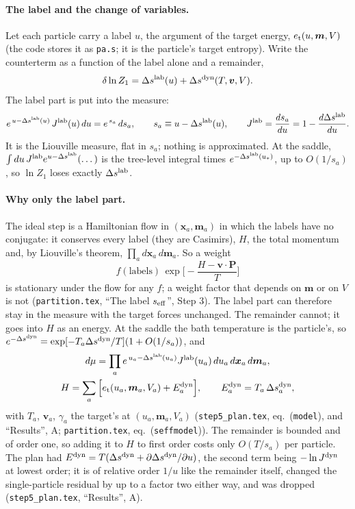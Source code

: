 \documentclass[11pt,aps,preprint,nofootinbib,superscriptaddress,tightenlines]{revtex4-2}
\def\st{\begin{equation}}
\def\stp{\end{equation}}
\let\oldparagraph\paragraph
\renewcommand{\paragraph}{\par\bigskip\oldparagraph}
\begin{document}
\paragraph{The label and the change of variables.}  Let each particle carry a label $u$, the argument of the target energy, $e_{\rm t}(u,\bm m,V)$ (the
code stores it as \texttt{pa.s}; it is the particle's target entropy).  Write the counterterm as a function of the label alone and a remainder,
\st
\delta\ln Z_1=\Delta s^{\rm lab}(u)+\Delta s^{\rm dyn}(T,\bm v,V) .
\label{eq:splitdef}
\stp
The label part is put into the measure:
\st
e^{\,u-\Delta s^{\rm lab}(u)}\,J^{\rm lab}(u)\,du=e^{\,s_a}\,ds_a,\qquad s_a\equiv u-\Delta s^{\rm lab}(u),\qquad J^{\rm lab}=\frac{ds_a}{du}=1-\frac{d\Delta s^{\rm lab}}{du} .
\label{eq:measure}
\stp
It is the Liouville measure, flat in $s_a$; nothing is approximated.  At the saddle, $\int du\,J^{\rm lab}e^{u-\Delta s^{\rm lab}}(\dots)$ is the tree-level
integral times $e^{-\Delta s^{\rm lab}(u_*)}$, up to $O(1/s_a)$, so $\ln Z_1$ loses exactly $\Delta s^{\rm lab}$.

\paragraph{Why only the label part.}  The ideal step is a Hamiltonian flow in $(\bm x_a,\bm m_a)$ in which the labels have no conjugate: it
conserves every label (they are Casimirs), $H$, the total momentum and, by Liouville's theorem, $\prod_ad\bm x_a\,d\bm m_a$.  So a weight
\st
f(\text{labels})\,\exp\Big[-\frac{H-\bm v\cdot\bm P}T\Big]
\stp
is stationary under the flow for any $f$; a weight factor that depends on $\bm m$ or on $V$ is not (\nolinkurl{partition.tex}, ``The label
$s_{\rm eff}$'', Step 3).  The label part can therefore stay in the measure with the target forces unchanged.  The remainder cannot; it goes into
$H$ as an energy.  At the saddle the bath temperature is the particle's, so $e^{-\Delta s^{\rm dyn}}=\exp[-T_a\Delta s^{\rm dyn}/T](1+O(1/s_a))$, and
\st
\begin{gathered}
d\mu=\prod_ae^{\,u_a-\Delta s^{\rm lab}(u_a)}J^{\rm lab}(u_a)\,du_a\,d\bm x_a\,d\bm m_a,\\
H=\sum_a\Big[e_{\rm t}(u_a,\bm m_a,V_a)+E^{\rm dyn}_a\Big],\qquad E^{\rm dyn}_a=T_a\,\Delta s^{\rm dyn}_a ,
\end{gathered}
\label{eq:splitmodel}
\stp
with $T_a$, $\bm v_a$, $\gamma_a$ the target's at $(u_a,\bm m_a,V_a)$ (\nolinkurl{step5_plan.tex}, eq.~(\texttt{model}), and ``Results'', A; \nolinkurl{partition.tex},
eq.~(\texttt{seffmodel})).  The remainder is bounded and of order one, so adding it to $H$ to first order costs only $O(T/s_a)$ per particle.  The plan had
$E^{\rm dyn}=T(\Delta s^{\rm dyn}+\partial\Delta s^{\rm dyn}/\partial u)$, the second term being $-\ln J^{\rm dyn}$ at lowest order; it is of relative order $1/u$ like
the remainder itself, changed the single-particle residual by up to a factor two either way, and was dropped (\nolinkurl{step5_plan.tex},
``Results'', A).
\end{document}

